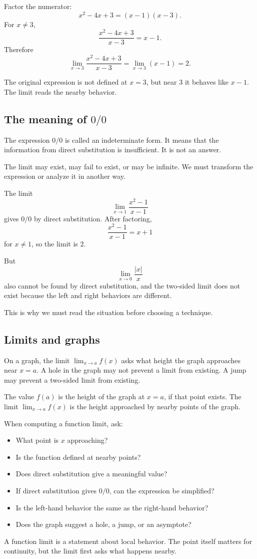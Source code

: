 Factor the numerator:
\[
x^2-4x+3=(x-1)(x-3).
\]
For \(x\ne3\),
\[
\frac{x^2-4x+3}{x-3}=x-1.
\]
Therefore
\[
\lim_{x\to3}\frac{x^2-4x+3}{x-3}
=\lim_{x\to3}(x-1)=2.
\]

The original expression is not defined at \(x=3\), but near \(3\) it behaves like \(x-1\). The limit reads the nearby behavior.

\subsection*{The meaning of \(0/0\)}

The expression \(0/0\) is called an indeterminate form. It means that the information from direct substitution is insufficient. It is not an answer.

The limit may exist, may fail to exist, or may be infinite. We must transform the expression or analyze it in another way.

\begin{examplebox}
The limit
\[
\lim_{x\to1}\frac{x^2-1}{x-1}
\]
gives \(0/0\) by direct substitution. After factoring,
\[
\frac{x^2-1}{x-1}=x+1
\]
for \(x\ne1\), so the limit is \(2\).

But
\[
\lim_{x\to0}\frac{|x|}{x}
\]
also cannot be found by direct substitution, and the two-sided limit does not exist because the left and right behaviors are different.
\end{examplebox}

This is why we must read the situation before choosing a technique.

\subsection*{Limits and graphs}

On a graph, the limit \(\lim_{x\to a} f(x)\) asks what height the graph approaches near \(x=a\). A hole in the graph may not prevent a limit from existing. A jump may prevent a two-sided limit from existing.

\begin{remarkbox}
The value \(f(a)\) is the height of the graph at \(x=a\), if that point exists. The limit \(\lim_{x\to a}f(x)\) is the height approached by nearby points of the graph.
\end{remarkbox}

\begin{summarybox}
When computing a function limit, ask:
\begin{itemize}
\item What point is \(x\) approaching?
\item Is the function defined at nearby points?
\item Does direct substitution give a meaningful value?
\item If direct substitution gives \(0/0\), can the expression be simplified?
\item Is the left-hand behavior the same as the right-hand behavior?
\item Does the graph suggest a hole, a jump, or an asymptote?
\end{itemize}
\end{summarybox}

A function limit is a statement about local behavior. The point itself matters for continuity, but the limit first asks what happens nearby.